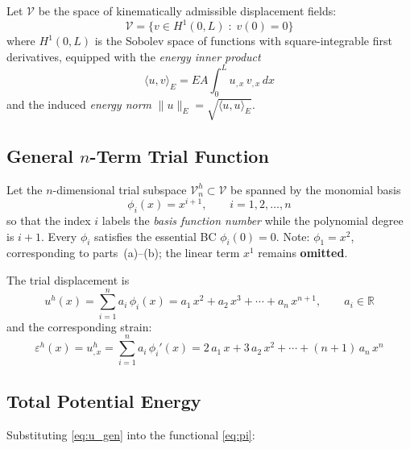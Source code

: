 \documentclass[11pt, a4paper]{article}
\begin{document}
Let $\mathcal{V}$ be the space of kinematically admissible displacement fields:
\begin{equation}\label{eq:V_space}
\mathcal{V}=\bigl\{v\in H^1(0,L)\;:\;v(0)=0\bigr\}
\end{equation}
where $H^1(0,L)$ is the Sobolev space of functions with square-integrable first derivatives,
equipped with the \emph{energy inner product}
\begin{equation}\label{eq:energy_ip}
\langle u,v\rangle_E = EA\int_0^L u_{,x}\,v_{,x}\,dx
\end{equation}
and the induced \emph{energy norm} $\|u\|_E=\sqrt{\langle u,u\rangle_E}$.

\subsection{General \texorpdfstring{$n$}{n}-Term Trial Function}

Let the $n$-dimensional trial subspace $\mathcal{V}^h_n\subset\mathcal{V}$ be spanned by the monomial basis
\begin{equation}\label{eq:basis_gen}
\phi_i(x)=x^{i+1},\qquad i=1,2,\dots,n
\end{equation}
so that the index $i$ labels the \emph{basis function number} while the
polynomial degree is $i+1$.  Every $\phi_i$ satisfies the essential BC
$\phi_i(0)=0$.  Note: $\phi_1=x^2$, corresponding to parts~(a)--(b);
the linear term $x^1$ remains \textbf{omitted}.

The trial displacement is
\begin{equation}\label{eq:u_gen}
u^h(x)=\sum_{i=1}^{n}a_i\,\phi_i(x)
       =a_1\,x^2 + a_2\,x^3 + \cdots + a_n\,x^{n+1},
\qquad a_i\in\mathbb{R}
\end{equation}
and the corresponding strain:
\begin{equation}\label{eq:eps_gen}
\varepsilon^h(x)=u^h_{,x}=\sum_{i=1}^{n}a_i\,\phi_i'(x)
               =2\,a_1\,x + 3\,a_2\,x^2 + \cdots + (n{+}1)\,a_n\,x^n
\end{equation}

\subsection{Total Potential Energy}

Substituting \cref{eq:u_gen} into the functional \cref{eq:pi}:
\end{document}
